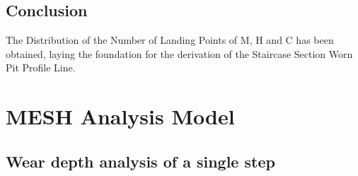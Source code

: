 \documentclass{mcmthesis}
\begin{document}
  
  \subsection{Conclusion}
  The Distribution of the Number of Landing Points of M, H and C has been obtained, laying the foundation for the derivation of the Staircase Section Worn Pit Profile Line.
  
 
  
\section{MESH Analysis Model}

\subsection{Wear depth analysis of a single step}
\end{document}
